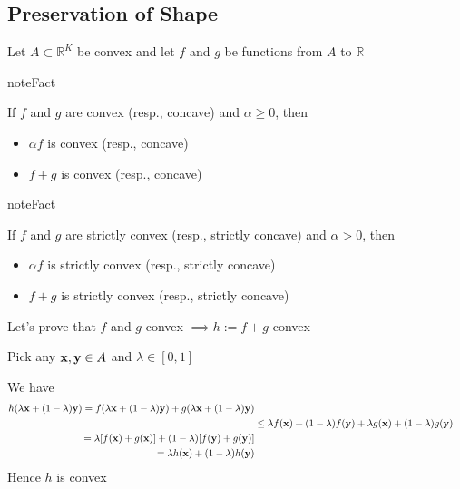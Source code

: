 \documentclass[letterpaper,10pt,english]{jupyterBook}
\begin{document}
\begin{figure}[htbp]
\centering

\noindent{}
\end{figure}


\subsection{Preservation of Shape}
\label{\detokenize{06.optimization_fundamentals:preservation-of-shape}}
\sphinxAtStartPar
Let \(A \subset \mathbb{R}^K\) be convex and let \(f\) and \(g\) be functions from \(A\)
to \(\mathbb{R}\)

\begin{sphinxadmonition}{note}{Fact}

\sphinxAtStartPar
If \(f\) and \(g\) are convex (resp., concave) and \(\alpha \geq 0\), then
\end{sphinxadmonition}
\begin{itemize}
\item {} 
\sphinxAtStartPar
\(\alpha f\) is convex (resp., concave)

\item {} 
\sphinxAtStartPar
\(f + g\) is convex (resp., concave)

\end{itemize}

\begin{sphinxadmonition}{note}{Fact}

\sphinxAtStartPar
If \(f\) and \(g\) are strictly convex (resp., strictly concave) and \(\alpha > 0\), then
\end{sphinxadmonition}
\begin{itemize}
\item {} 
\sphinxAtStartPar
\(\alpha f\) is strictly convex (resp., strictly concave)

\item {} 
\sphinxAtStartPar
\(f + g\) is strictly convex (resp., strictly concave)

\end{itemize}

\sphinxAtStartPar
Let’s prove that \(f\) and \(g\) convex \(\implies h := f + g\) convex

\sphinxAtStartPar
Pick any \({\bf x}, {\bf y} \in A\) and \(\lambda \in [0, 1]\)

\sphinxAtStartPar
We have
\begin{equation*}
\begin{split}
%
h(\lambda {\bf x} + (1 - \lambda) {\bf y})
= f(\lambda {\bf x} + (1 - \lambda) {\bf y})
+ g(\lambda {\bf x} + (1 - \lambda) {\bf y})
\\
& \leq 
\lambda f({\bf x}) + (1 - \lambda) f({\bf y})
+
\lambda g({\bf x}) + (1 - \lambda) g({\bf y})
\\
=
\lambda [f({\bf x}) + g({\bf x})]
+ (1 - \lambda) [f({\bf y}) + g({\bf y})]
\\
=
\lambda h({\bf x}) + (1 - \lambda) h({\bf y})
%
\end{split}
\end{equation*}
\sphinxAtStartPar
Hence \(h\) is convex
\end{document}
